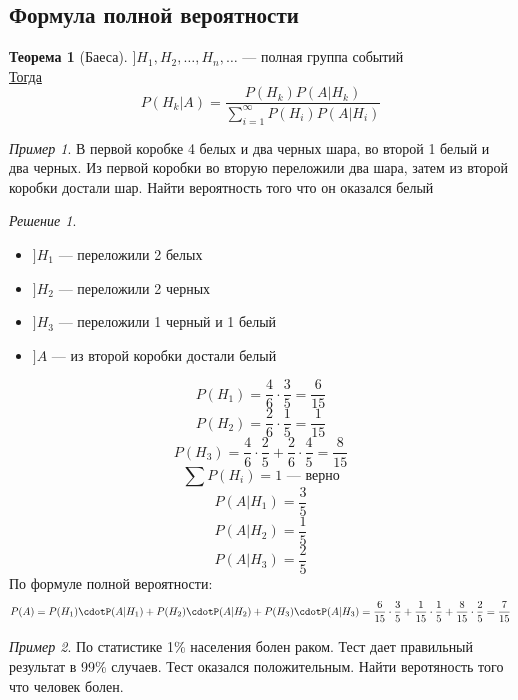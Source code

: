 \documentclass[english]{article}
\theoremstyle{plain}
\theoremstyle{remark}
\newtheorem*{solution}{Решение}
\newtheorem*{examp}{Пример}
\theoremstyle{definition}
\newtheorem{theorem}{Теорема}[section]
\begin{document}
\subsection{Формула полной вероятности}
\label{sec:org7171aa9}
\begin{theorem}[Баеса]
\(] H_1, H_2, \dots, H_n ,\dots\) --- полная группа событий \\
\uline{Тогда} \[ P(H_k|A) = \frac{P(H_k)P(A|H_k)}{\sum_{i = 1}^{\infty}P(H_i)P(A|H_i)} \]
\end{theorem}
\begin{examp}
В первой коробке 4 белых и два черных шара, во второй 1 белый и два
черных. Из первой коробки во вторую переложили два шара, затем из
второй коробки достали шар. Найти вероятность того что он оказался белый
\end{examp}
\begin{solution}
\-
\begin{itemize}
\item \(] H_1\) --- переложили 2 белых
\item \(] H_2\) --- переложили 2 черных
\item \(] H_3\) --- переложили 1 черный и 1 белый
\item \(] A\) --- из второй коробки достали белый
\end{itemize}
\[ P(H_1) = \frac{4}{6}\cdot\frac{3}{5} =  \frac{6}{15} \]
\[ P(H_2) = \frac{2}{6}\cdot\frac{1}{5} = \frac{1}{15} \]
\[ P(H_3) = \frac{4}{6}\cdot\frac{2}{5} + \frac{2}{6}\cdot\frac{4}{5} = \frac{8}{15} \]
\[ \sum P(H_i) = 1\text{ --- верно} \]
\[ P(A|H_1) = \frac{3}{5} \]
\[ P(A|H_2) = \frac{1}{5} \]
\[ P(A|H_3) = \frac{2}{5} \]
По формуле полной вероятности:
\[ P(A) = P(H_1)\cdotP(A|H_1) + P(H_2)\cdotP(A|H_2) + P(H_3)\cdotP(A|H_3) = \frac{6}{15}\cdot\frac{3}{5} + \frac{1}{15}\cdot\frac{1}{5} + \frac{8}{15}\cdot\frac{2}{5} = \frac{7}{15}\]
\end{solution}
\begin{examp}
По статистике 1\% населения болен раком. Тест дает правильный результат
в 99\% случаев. Тест оказался положительным. Найти веротяность того что
человек болен.
\end{examp}
\end{document}
